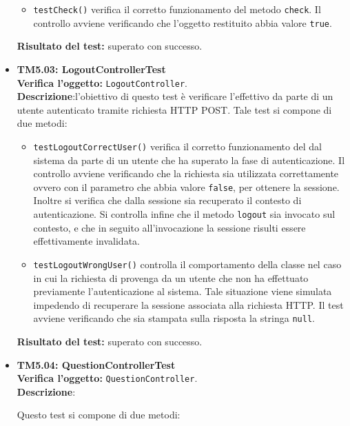 \begin{itemize}
\begin{itemize}
\item \texttt{testCheck()} verifica il corretto funzionamento del metodo \texttt{check}. Il controllo avviene verificando che l'oggetto restituito abbia valore \texttt{true}.

\end{itemize}
\textbf{Risultato del test:} superato con successo.


\item \textbf{TM5.03: LogoutControllerTest}\\
\textbf{Verifica l'oggetto:} \texttt{LogoutController}.\\
\textbf{Descrizione}:l'obiettivo di questo test è verificare l'effettivo  da parte di un utente autenticato tramite richiesta HTTP POST.
Tale test si compone di due metodi:

\begin{itemize}

\item \texttt{testLogoutCorrectUser()} verifica il corretto funzionamento del  dal sistema da parte di un utente che ha superato la fase di autenticazione. Il controllo avviene verificando che la richiesta sia utilizzata correttamente ovvero con il parametro che abbia valore \texttt{false}, per ottenere la sessione. Inoltre si verifica che dalla sessione sia recuperato il contesto di autenticazione. Si controlla infine che il metodo \texttt{logout} sia invocato sul contesto, e che in seguito all'invocazione la sessione risulti essere effettivamente invalidata.

\item \texttt{testLogoutWrongUser()}  controlla il comportamento della classe nel caso in cui la richiesta di  provenga da un utente che non ha effettuato previamente l'autenticazione al sistema. Tale situazione viene simulata impedendo di recuperare la sessione associata alla richiesta HTTP. Il test avviene verificando che sia stampata sulla risposta la stringa \texttt{null}.
\end{itemize}
\textbf{Risultato del test:} superato con successo.

\item \textbf{TM5.04: QuestionControllerTest}\\
\textbf{Verifica l'oggetto:} \texttt{QuestionController}.\\
\textbf{Descrizione}: %

Questo test si compone di due metodi:
\begin{itemize}


\end{itemize}
\end{itemize}
